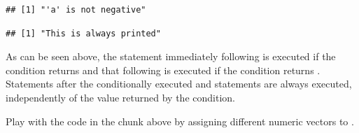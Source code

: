 \documentclass[krantz2]{krantz}\usepackage{knitr}
\begin{document}
\begin{knitrout}\footnotesize
{}\color{fgcolor}\begin{kframe}
\begin{alltt}
 \hlkwb{<-} 
  \hlopt{<} \hlstd{)} \hlstd{(}\hlstd{)}  \hlstd{(}\hlstd{)}
\end{alltt}
\begin{verbatim}
## [1] "'a' is not negative"
\end{verbatim}
\begin{alltt}
\hlstd{(}\hlstd{)}
\end{alltt}
\begin{verbatim}
## [1] "This is always printed"
\end{verbatim}
\end{kframe}
\end{knitrout}

As can be seen above, the statement immediately following  is executed if the condition returns  and that following  is executed if the condition returns . Statements after the conditionally executed  and  statements are always executed, independently of the value returned by the condition.

\begin{playground}
Play with the code in the chunk above by assigning different numeric vectors to .
\end{playground}
\end{document}
